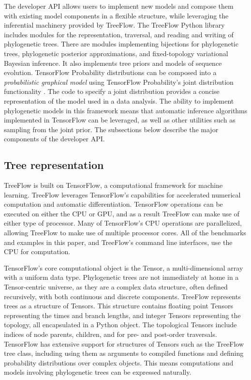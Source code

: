 The developer API allows users to implement new models and compose them with existing model components in a flexible structure, while leveraging the inferential machinery provided by TreeFlow. The TreeFlow Python library includes modules for the representation, traversal, and reading and writing of phylogenetic trees. There are modules implementing bijections for phylogenetic trees, phylogenetic posterior approximations, and fixed-topology variational Bayesian inference. It also implements tree priors and models of sequence evolution. TensorFlow Probability distributions can be composed into a \textit{probabilistic graphical model} using TensorFlow Probability's joint distribution functionality \cite{piponi2020joint}. The code to specify a joint distribution provides a concise representation of the model used in a data analysis. The ability to implement phylogenetic models in this framework means that automatic inference algorithms implemented in TensorFlow can be leveraged, as well as other utilities such as sampling from the joint prior. The subsections below describe the major components of the developer API.

\subsection{Tree representation}

TreeFlow is built on TensorFlow, a computational framework for machine learning. TreeFlow leverages TensorFlow's capabilities for accelerated numerical computation and automatic differentiation. TensorFlow operations can be executed on either the CPU or GPU, and as a result TreeFlow can make use of either type of processor. Many of TensorFlow's CPU operations are parallelized, allowing TreeFlow to make use of multiple processor cores. All of the benchmarks and examples in this paper, and TreeFlow's command line interfaces, use the CPU for computation.

TensorFlow's core computational object is the Tensor, a multi-dimensional array with a uniform data type. Phylogenetic trees are not immediately at home in a Tensor-centric universe, as they are a complex data structure, often defined recursively, with both continuous and discrete components. TreeFlow represents trees as a structure of Tensors. This structure contains floating point Tensors representing the times and branch lengths, and integer Tensors representing the topology, all encapsulated in a Python object. The topological Tensors include indices of node parents, children, and for pre- and post-order traversals. TensorFlow has extensive support for structures of Tensors such as the TreeFlow tree class, including using them as arguments to compiled functions and defining probability distributions over complex objects. This means computations and models involving phylogenetic trees can be expressed naturally.

